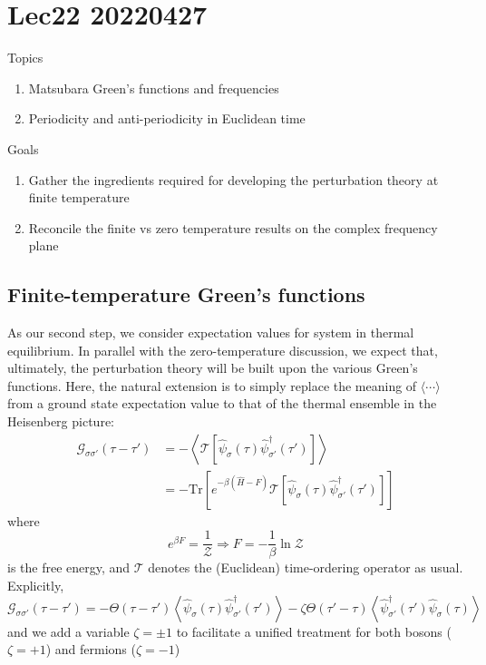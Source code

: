 \chapter{Lec22 20220427}

Topics

\begin{enumerate}
    \item Matsubara Green's functions and frequencies
    \item Periodicity and anti-periodicity in Euclidean time
\end{enumerate}

Goals

\begin{enumerate}
    \item Gather the ingredients required for developing the perturbation theory at finite temperature
    \item Reconcile the finite vs zero temperature results on the complex frequency plane
\end{enumerate}

\section{Finite-temperature Green's functions}

As our second step, we consider expectation values for system in thermal equilibrium. In parallel with the zero-temperature discussion, we expect that, ultimately, the perturbation theory will be built upon the various Green's functions. Here, the natural extension is to simply replace the meaning of $\langle \cdots \rangle$ from a ground state expectation value to that of the thermal ensemble in the Heisenberg picture:
\begin{align*}
    \mathcal{G} _{\sigma \sigma '}\left( \tau -\tau ' \right) &=-\left< \mathcal{T} \left[ \hat{\psi}_{\sigma}\left( \tau \right) \hat{\psi}_{\sigma '}^{\dagger}\left( \tau ' \right) \right] \right> \\
    &=-\mathrm{Tr}\left[ e^{-\beta \left( \hat{H}-F \right)}\mathcal{T} \left[ \hat{\psi}_{\sigma}\left( \tau \right) \hat{\psi}_{\sigma '}^{\dagger}\left( \tau ' \right) \right] \right]
\end{align*}
where
\[ e^{\beta F}=\frac{1}{\mathcal{Z}}\Rightarrow F=-\frac{1}{\beta}\ln \mathcal{Z} \]
is the free energy, and $\mathcal{T}$ denotes the (Euclidean) time-ordering operator as usual. Explicitly,
\[ \mathcal{G} _{\sigma \sigma '}\left( \tau -\tau ' \right) =-\Theta \left( \tau -\tau ' \right) \left< \hat{\psi}_{\sigma}\left( \tau \right) \hat{\psi}_{\sigma '}^{\dagger}\left( \tau ' \right) \right> -\zeta \Theta \left( \tau '-\tau \right) \left< \hat{\psi}_{\sigma '}^{\dagger}\left( \tau ' \right) \hat{\psi}_{\sigma}\left( \tau \right) \right> \]
and we add a variable $\zeta=\pm 1$ to facilitate a unified treatment for both bosons ($\zeta =+1$) and fermions ($\zeta =-1$)

